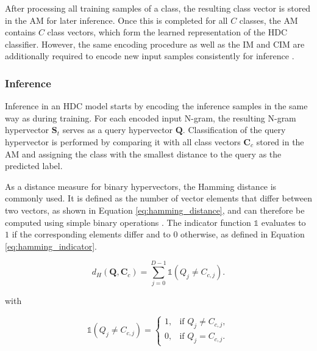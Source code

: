     After processing all training samples of a class, the resulting class vector is stored in the \ac{AM} for later inference. Once this is completed for all $C$ classes, the \ac{AM} contains $C$ class vectors, which form the learned representation of the HDC classifier. However, the same encoding procedure as well as the \ac{IM} and \ac{CIM} are additionally required to encode new input samples consistently for inference \cite{ge_classification_2020}.

    
    \subsubsection{Inference}
    Inference in an HDC model starts by encoding the inference samples in the same way as during training. For each encoded input N-gram, the resulting N-gram hypervector $\mathbf{S}_t$ serves as a query hypervector $\mathbf{Q}$. Classification of the query hypervector is performed by comparing it with all class vectors $\mathbf{C}_c$ stored in the AM and assigning the class with the smallest distance to the query as the predicted label.
    
    As a distance measure for binary hypervectors, the Hamming distance is commonly used. It is defined as the number of vector elements that differ between two vectors, as shown in Equation \ref{eq:hamming_distance}, and can therefore be computed using simple binary operations \cite{ge_classification_2020}. The indicator function $\mathbb{1}$ evaluates to $1$ if the corresponding elements differ and to $0$ otherwise, as defined in Equation \ref{eq:hamming_indicator}.
    
    \begin{equation}
        d_H\!\left(\mathbf{Q}, \mathbf{C}_c\right)
        =
        \sum_{j=0}^{D-1}
        \mathbb{1}\!\left(Q_j \neq C_{c,j}\right).
        \label{eq:hamming_distance}
    \end{equation}

        with

        \begin{equation}
        \mathbb{1}\!\left(Q_j \neq C_{c,j}\right)
        =
        \begin{cases}
            1, & \text{if } Q_j \neq C_{c,j},\\
            0, & \text{if } Q_j = C_{c,j}.
        \end{cases}
        \label{eq:hamming_indicator}
        \end{equation}

